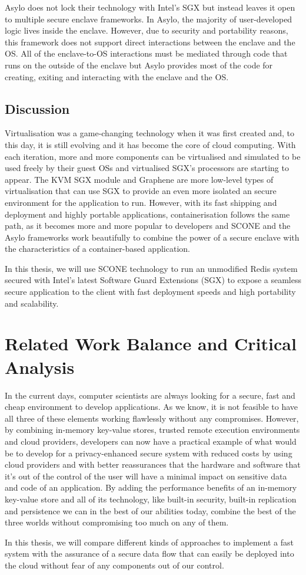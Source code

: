 Asylo does not lock their technology with Intel's \gls{SGX} but instead leaves it open to multiple secure enclave frameworks. In Asylo, the majority of user-developed logic lives inside the enclave. However, due to security and portability reasons, this framework does not support direct interactions between the enclave and the \gls{OS}. All of the enclave-to-OS interactions must be mediated through code that runs on the outside of the enclave but Asylo provides most of the code for creating, exiting and interacting with the enclave and the \gls{OS}.

\subsection{Discussion}
\label{ssec:s4_discussion}

Virtualisation was a game-changing technology when it was first created and, to this day, it is still evolving and it has become the core of cloud computing. With each iteration, more and more components can be virtualised and simulated to be used freely by their guest \glspl{OS} and virtualised SGX's processors are starting to appear. The \gls{KVM} \gls{SGX} module and Graphene are more low-level types of virtualisation that can use \gls{SGX} to provide an even more isolated an secure environment for the application to run. However, with its fast shipping and deployment and highly portable applications, containerisation follows the same path, as it becomes more and more popular to developers and SCONE and the Asylo frameworks work beautifully to combine the power of a secure enclave with the characteristics of a container-based application.

In this thesis, we will use SCONE technology to run an unmodified Redis system secured with Intel's latest Software Guard Extensions (\gls{SGX}) to expose a seamless secure application to the client with fast deployment speeds and high portability and scalability.

\section{Related Work Balance and Critical Analysis}
\label{sec:related_work_balance_and_critical_analysis}

In the current days, computer scientists are always looking for a secure, fast and cheap environment to develop applications. As we know, it is not feasible to have all three of these elements working flawlessly without any compromises. However, by combining in-memory key-value stores, trusted remote execution environments and cloud providers, developers can now have a practical example of what would be to develop for a privacy-enhanced secure system with reduced costs by using cloud providers and with better reassurances that the hardware and software that it's out of the control of the user will have a minimal impact on sensitive data and code of an application. By adding the performance benefits of an in-memory key-value store and all of its technology, like built-in security, built-in replication and persistence we can in the best of our abilities today, combine the best of the three worlds without compromising too much on any of them.

In this thesis, we will compare different kinds of approaches to implement a fast system with the assurance of a secure data flow that can easily be deployed into the cloud without fear of any components out of our control.